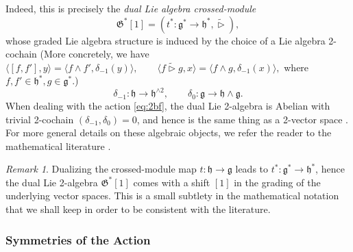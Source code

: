 \documentclass[onecolumn]{article}
\theoremstyle{theorem}
\theoremstyle{remark}
\newtheorem{remark}{Remark}[section]
\theoremstyle{example}
\theoremstyle{definition}
\numberwithin{equation}{section}
\begin{document}
Indeed, this is precisely the {\it {dual Lie algebra crossed-module}} $$\mathfrak{G}^*[1]=(t^*:\mathfrak{g}^*\rightarrow\mathfrak{h}^*,\tilde\rhd),$$ whose graded Lie algebra structure is induced by the choice of a Lie algebra 2-cochain {(More concretely, we have
$
    \langle [f,f'],y\rangle = \langle f\wedge f',\delta_{-1}(y)\rangle,\qquad \langle f\tilde \rhd g,x\rangle = \langle f\wedge g,\delta_{-1}(x)\rangle,\nonumber
$
where $f,f'\in\mathfrak{h}^*,g\in\mathfrak{g}^*$.)}%
\begin{equation}
    \delta_{-1}: \mathfrak{h}\rightarrow \mathfrak{h}^{\wedge 2},\qquad \delta_0:\mathfrak{g}\rightarrow \mathfrak{h}\wedge\mathfrak{g}.\nonumber
\end{equation}
{When} dealing with the action   \eqref{eq:2bf}, the dual Lie 2-algebra is Abelian with trivial 2-cochain $(\delta_{-1},\delta_0)=0$, and hence is the same thing as a 2-vector space \cite{Baez:2004in}. For more general details on these algebraic objects, we refer the reader to the mathematical literature \cite{Bai_2013,Chen:2012gz,chen:2022}.

\begin{remark}
Dualizing the crossed-module map $t:\mathfrak{h}\rightarrow\mathfrak{g}$ leads to $t^*:\mathfrak{g}^*\rightarrow\mathfrak{h}^*$, hence the dual Lie 2-algebra $\mathfrak{G}^*[1]$ comes with a shift $[1]$ in the grading of the underlying vector spaces. This is a small subtlety in the mathematical notation that we shall keep in order to be consistent with the literature. 
\end{remark}

\subsubsection{Symmetries of the Action}
\end{document}

